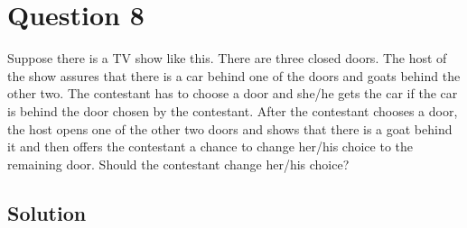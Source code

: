 \section*{Question 8}

Suppose there is a TV show like this. There are three closed doors. The host of the show assures that there is a car behind one of the doors and goats behind the other two. The contestant has to choose a door and she/he gets the car if the car is behind the door chosen by the contestant. After the contestant chooses a door, the host opens one of the other two doors and shows that there is a goat behind it and then offers the contestant a chance to change her/his choice to the remaining door. Should the contestant change her/his choice?

\subsection*{Solution}
